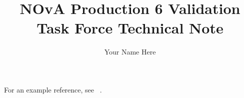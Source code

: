 \documentclass{article}
\title{NOvA Production 6 Validation Task Force Technical Note}
\author{Your Name Here}
\begin{document}
\maketitle

For an example reference, see ~\cite{2021-06-29-retriggering-summary}.



\end{document}
